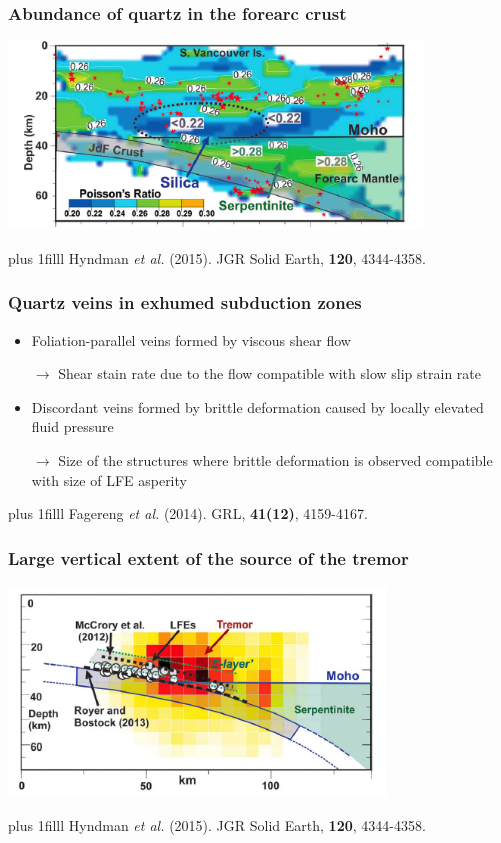 \documentclass{beamer}
\newcommand{\btVFill}{\vskip0pt plus 1filll}
\begin{document}
	\begin{frame}
		\frametitle{Abundance of quartz in the forearc crust}
		\begin{center}
			\includegraphics[trim={0cm 0cm 0cm 0cm}, clip, width=11cm]{articles/hyndmann_al_2015_8a.png}
		\end{center}
		\btVFill
		\tiny{Hyndman \textit{et al.} (2015). JGR Solid Earth, \textbf{120}, 4344-4358.}
	\end{frame}

	\begin{frame}
		\frametitle{Quartz veins in exhumed subduction zones}
		\vspace{2em}
	
		\begin{itemize}
			\item Foliation-parallel veins formed by viscous shear flow

			$\rightarrow$ Shear stain rate due to the flow compatible with slow slip strain rate

			\vspace{1em}

			\item Discordant veins formed by brittle deformation caused by locally elevated fluid pressure

			$\rightarrow$ Size of the structures where brittle deformation is observed compatible with size of LFE asperity
		\end{itemize}
		\btVFill
		\tiny{Fagereng \textit{et al.} (2014). GRL, \textbf{41(12)}, 4159-4167.}
	\end{frame}

	\begin{frame}
		\frametitle{Large vertical extent of the source of the tremor}
		\begin{center}
			\includegraphics[trim={0cm 0cm 0cm 0cm}, clip, width=10cm]{articles/hyndmann_al_2015_8b.png}
		\end{center}
		\btVFill
		\tiny{Hyndman \textit{et al.} (2015). JGR Solid Earth, \textbf{120}, 4344-4358.}
	\end{frame}
\end{document}
